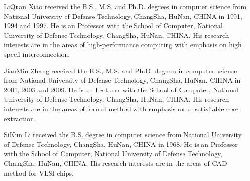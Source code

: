 \documentclass[journal]{IEEEtran}
\begin{document}
\begin{IEEEbiographynophoto}{LiQuan Xiao}
received the B.S., M.S.
and Ph.D. degrees in computer science from
National University of Defense Technology, ChangSha, HuNan, CHINA in 1991, 1994 and 1997.
He is an Professor with the School of Computer,
National University of Defense Technology, ChangSha, HuNan, CHINA.
His research
interests are in the areas of high-performance computing with emphasis on high speed interconnection.
\end{IEEEbiographynophoto}

\begin{IEEEbiography}{JianMin Zhang}
received the B.S., M.S.
and Ph.D. degrees in computer science from
National University of Defense Technology, ChangSha, HuNan, CHINA in 2001, 2003 and 2009.
He is an Lecturer with the School of Computer,
National University of Defense Technology, ChangSha, HuNan, CHINA.
His research
interests are in the areas of formal method with emphasis on unsatisfiable core extraction.
\end{IEEEbiography}

\begin{IEEEbiography}{SiKun Li}
received the B.S. degree in computer science from
National University of Defense Technology, ChangSha, HuNan, CHINA in 1968.
He is an Professor with the School of Computer,
National University of Defense Technology, ChangSha, HuNan, CHINA.
His research
interests are in the areas of CAD method for VLSI chips.
\end{IEEEbiography}






%




\end{document}
